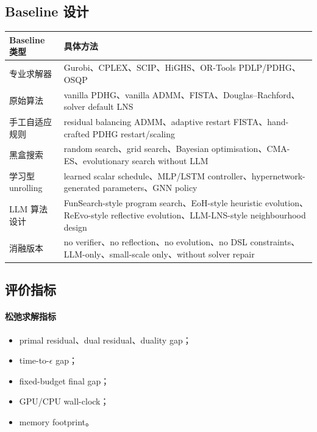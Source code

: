 \documentclass[UTF8,a4paper,12pt,fontset=fandol]{ctexart}
\begin{document}
\subsection{Baseline 设计}

\begin{longtable}{p{3.5cm}p{9.2cm}}
\toprule
Baseline 类型 & 具体方法 \\
\midrule
专业求解器 & Gurobi、CPLEX、SCIP、HiGHS、OR-Tools PDLP/PDHG、OSQP \\
原始算法 & vanilla PDHG、vanilla ADMM、FISTA、Douglas--Rachford、solver default LNS \\
手工自适应规则 & residual balancing ADMM、adaptive restart FISTA、hand-crafted PDHG restart/scaling \\
黑盒搜索 & random search、grid search、Bayesian optimisation、CMA-ES、evolutionary search without LLM \\
学习型 unrolling & learned scalar schedule、MLP/LSTM controller、hypernetwork-generated parameters、GNN policy \\
LLM 算法设计 & FunSearch-style program search、EoH-style heuristic evolution、ReEvo-style reflective evolution、LLM-LNS-style neighbourhood design \\
消融版本 & no verifier、no reflection、no evolution、no DSL constraints、LLM-only、small-scale only、without solver repair \\
\bottomrule
\end{longtable}

\subsection{评价指标}

\paragraph{松弛求解指标}
\begin{itemize}[leftmargin=2em]
    \item primal residual、dual residual、duality gap；
    \item time-to-$\epsilon$ gap；
    \item fixed-budget final gap；
    \item GPU/CPU wall-clock；
    \item memory footprint。
\end{itemize}
\end{document}
